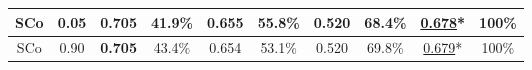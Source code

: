 \begin{table}[!t]
\begin{tabular}{|@{}c@{}|@{}c@{}||@{}c@{}|@{}c@{}||@{}c@{}|@{}c@{}||@{}c@{}|@{}c@{}||@{}c@{}||@{}c@{}|}
SCo & 0.05 & \bf{0.705} & 41.9\%
&0.655 &55.8\%
& 0.520	&68.4\%
&\underline{0.678}* & 100\%
\\
\hline SCo& 0.90 & {\bf 0.705} & 43.4\% 
&0.654 & 53.1\%
&0.520	&69.8\%
&\underline{0.679}*&
100\%
\\
\hline

\end{tabular}
\end{table}



